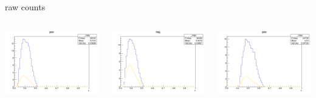 \begin{frame}{raw counts}
\begin{columns}
\begin{column}[T]{0.25\textwidth}
\includegraphics[width = \textwidth]{results/yield/statistics/yield_x_Q2_z_0.50_5.000_0.40_pos.png}
\end{column}
\begin{column}[T]{0.25\textwidth}
\includegraphics[width = \textwidth]{results/yield/statistics/yield_x_Q2_z_0.50_5.000_0.40_neg.png}
\end{column}
\begin{column}[T]{0.25\textwidth}
\includegraphics[width = \textwidth]{results/yield/statistics/yield_x_Q2_z_0.50_5.000_0.50_pos.png}

\end{column}
\end{columns}
\end{frame}
